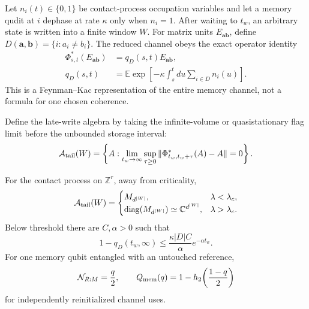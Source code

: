 Let \(n_i(t)\in\{0,1\}\) be contact-process occupation variables and let a
memory qudit at \(i\) dephase at rate \(\kappa\) only when \(n_i=1\).
After waiting to \(t_w\), an arbitrary state is written into a finite window
\(W\).  For matrix units
\(E_{\boldsymbol a\boldsymbol b}\), define
\(D(\boldsymbol a,\boldsymbol b)=\{i:a_i\ne b_i\}\).  The reduced channel
obeys the exact operator identity
\begin{align}
 \Phi^*_{s,t}(E_{\boldsymbol a\boldsymbol b})
 &=q_D(s,t)E_{\boldsymbol a\boldsymbol b},\nonumber\\
 q_D(s,t)&=\mathbb E\exp\!\left[
 -\kappa\int_s^t\!du\sum_{i\in D}n_i(u)\right].
 \label{eq:loop-memory-fk}
\end{align}
This is a Feynman--Kac representation of the entire memory channel, not a
formula for one chosen coherence.

Define the late-write algebra by taking the infinite-volume or
quasistationary flag limit before the unbounded storage interval:
\begin{equation}
 \mathcal A_{\rm tail}(W)=
 \left\{A:\lim_{t_w\to\infty}\sup_{\tau\ge0}
 \|\Phi^*_{t_w,t_w+\tau}(A)-A\|=0\right\}.
 \label{eq:loop-tail-definition}
\end{equation}

\begin{theorem}
\label{thm:loop-memory}
For the contact process on \(\mathbb Z^r\), away from criticality,
\begin{equation}
 \mathcal A_{\rm tail}(W)=
 \begin{cases}
 M_{d^{|W|}},&\lambda<\lambda_c,\\
 \operatorname{diag}(M_{d^{|W|}})
 \simeq\mathbb C^{d^{|W|}},&\lambda>\lambda_c.
 \end{cases}
 \label{eq:loop-memory-algebra}
\end{equation}
Below threshold there are \(C,\alpha>0\) such that
\begin{equation}
 1-q_D(t_w,\infty)
 \le\frac{\kappa|D|C}{\alpha}e^{-\alpha t_w}.
 \label{eq:loop-memory-bound}
\end{equation}
For one memory qubit entangled with an untouched reference,
\begin{equation}
 \mathcal N_{R:M}=\frac q2,
 \qquad
 Q_{\rm mem}(q)=
 1-h_2\!\left(\frac{1-q}{2}\right)
 \label{eq:loop-memory-capacity}
\end{equation}
for independently reinitialized channel uses.
\end{theorem}

